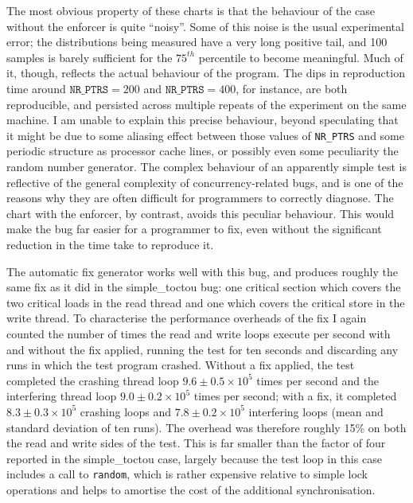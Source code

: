 The most obvious property of these charts is that the behaviour of the
case without the enforcer is quite ``noisy''.  Some of this noise is
the usual experimental error; the distributions being measured have a
very long positive tail, and 100 samples is barely sufficient for the
$75^{th}$ percentile to become meaningful.  Much of it, though,
reflects the actual behaviour of the program.  The dips in
reproduction time around $\texttt{NR\_PTRS} = 200$ and
$\texttt{NR\_PTRS} = 400$, for instance, are both reproducible, and
persisted across multiple repeats of the experiment on the same
machine.  I am unable to explain this precise behaviour, beyond
speculating that it might be due to some aliasing effect between those
values of \texttt{NR\_PTRS} and some periodic structure as processor
cache lines, or possibly even some peculiarity the random number
generator.  The complex behaviour of an apparently simple test is
reflective of the general complexity of concurrency-related bugs, and
is one of the reasons why they are often difficult for programmers to
correctly diagnose\needCite{}.  The chart with the enforcer, by
contrast, avoids this peculiar behaviour.  This would make the bug far
easier for a programmer to fix, even without the significant reduction
in the time take to reproduce it.

The automatic fix generator works well with this bug, and produces
roughly the same fix as it did in the simple\_toctou bug: one critical
section which covers the two critical loads in the read thread and one
which covers the critical store in the write thread.  To characterise
the performance overheads of the fix I again counted the number of
times the read and write loops execute per second with and without the
fix applied, running the test for ten seconds and discarding any runs
in which the test program crashed.  Without a fix applied, the test
completed the crashing thread loop $9.6 \pm 0.5 {\times} 10^5$ times
per second and the interfering thread loop $9.0 \pm 0.2 {\times} 10^5$
times per second; with a fix, it completed $8.3 \pm 0.3 \times 10^5$
crashing loops and $7.8 \pm 0.2 \times 10^5$ interfering loops (mean
and standard deviation of ten runs).  The overhead was therefore
roughly 15\% on both the read and write sides of the test.  This is
far smaller than the factor of four reported in the simple\_toctou
case, largely because the test loop in this case includes a call to
\verb|random|, which is rather expensive relative to simple lock
operations and helps to amortise the cost of the additional
synchronisation.

